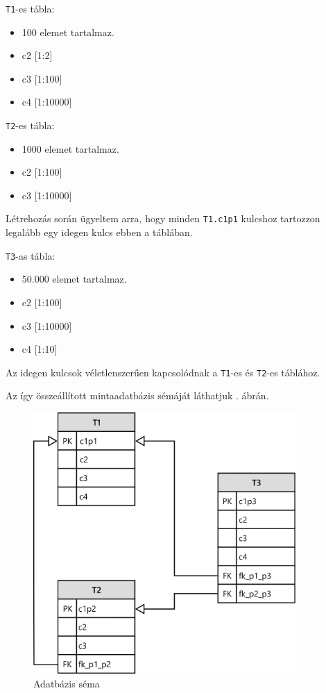 \bigskip

\noindent \texttt{T1}-es tábla:
\begin{itemize}
\item 100 elemet tartalmaz.
\item c2    [1:2]
\item c3    [1:100]
\item c4    [1:10000]
\end{itemize}

\noindent \texttt{T2}-es tábla:
\begin{itemize}
\item 1000 elemet tartalmaz.
\item c2    [1:100]
\item c3    [1:10000]
\end{itemize}

Létrehozás során ügyeltem arra, hogy minden \texttt{T1.c1p1} kulcshoz tartozzon legalább egy idegen kulcs ebben a táblában.

\bigskip

\noindent \texttt{T3}-as tábla:
\begin{itemize}   
\item 50.000 elemet tartalmaz.
\item c2    [1:100]
\item c3    [1:10000]
\item c4    [1:10]
\end{itemize}
Az idegen kulcsok véletlenszerűen kapcsolódnak a \texttt{T1}-es és \texttt{T2}-es táblához.

Az így összeállított mintaadatbázis sémáját láthatjuk . ábrán.

\begin{figure}[h!]
\centering
\includegraphics[width=10cm]{images/new_schema.png}
\caption{Adatbázis séma}
\label{fig:new_schema}
\end{figure}

